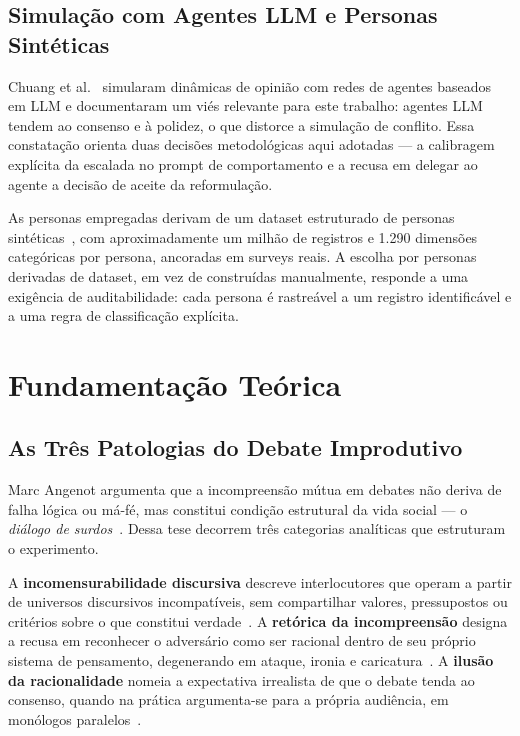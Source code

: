\documentclass[conference]{IEEEtran} \IEEEoverridecommandlockouts %
\begin{document}
\subsection{Simulação com Agentes LLM e Personas Sintéticas}

Chuang et al.~\cite{chuang2023simulating} simularam dinâmicas de opinião com
redes de agentes baseados em LLM e documentaram um viés relevante para este
trabalho: agentes LLM tendem ao consenso e à polidez, o que distorce a
simulação de conflito. Essa constatação orienta duas decisões metodológicas
aqui adotadas — a calibragem explícita da escalada no prompt de comportamento e
a recusa em delegar ao agente a decisão de aceite da reformulação.

As personas empregadas derivam de um dataset estruturado de personas
sintéticas~\cite{li2026matraix}, com aproximadamente um milhão de registros e
1.290 dimensões categóricas por persona, ancoradas em surveys reais. A escolha
por personas derivadas de dataset, em vez de construídas manualmente, responde
a uma exigência de auditabilidade: cada persona é rastreável a um registro
identificável e a uma regra de classificação explícita.

\section{Fundamentação Teórica}

\subsection{As Três Patologias do Debate Improdutivo}

Marc Angenot argumenta que a incompreensão mútua em debates não deriva de
falha lógica ou má-fé, mas constitui condição estrutural da vida social — o
\textit{diálogo de surdos}~\cite{angenot2008dialogues}. Dessa tese decorrem três
categorias analíticas que estruturam o experimento.

A \textbf{incomensurabilidade discursiva} descreve interlocutores que operam a
partir de universos discursivos incompatíveis, sem compartilhar valores,
pressupostos ou critérios sobre o que constitui verdade~\cite{angenot2010discurso}.
A \textbf{retórica da incompreensão} designa a recusa em reconhecer o adversário
como ser racional dentro de seu próprio sistema de pensamento, degenerando em
ataque, ironia e caricatura~\cite{angenot2008dialogues}. A \textbf{ilusão da
racionalidade} nomeia a expectativa irrealista de que o debate tenda ao
consenso, quando na prática argumenta-se para a própria audiência, em monólogos
paralelos~\cite{angenot2006divergent}.
\end{document}
